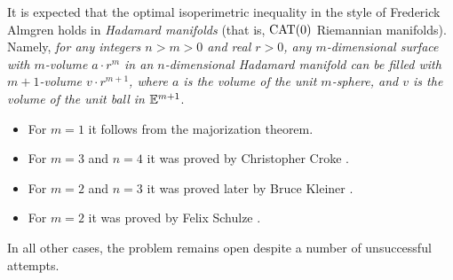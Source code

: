 It is expected that the optimal isoperimetric inequality in the style of Frederick Almgren \cite{almgren} holds in \emph{Hadamard manifolds} (that is, $\mathrm{CAT}(0)$ Riemannian manifolds).
Namely, \textit{for any integers $n>m>0$ and real $r>0$, any $m$-dimensional surface with $m$-volume $a\cdot r^m$ in an $n$-dimensional Hadamard manifold can be filled with $m+1$-volume $v\cdot r^{m+1}$, where $a$ is the volume of the unit $m$-sphere, and $v$ is the volume of the unit ball in $\mathbb{E}^{m+1}$}.
\begin{itemize}
 \item For $m=1$ it follows from the majorization theorem.
 \item For $m=3$ and $n=4$ it was proved by Christopher Croke \cite{croke}.
 \item For $m=2$ and $n=3$ it was proved later by Bruce Kleiner \cite{kleiner-1992}.
 \item For $m=2$ it was proved by Felix Schulze \cite{schulze}.
\end{itemize}
In all other cases, the problem remains open despite a number of unsuccessful attempts.
